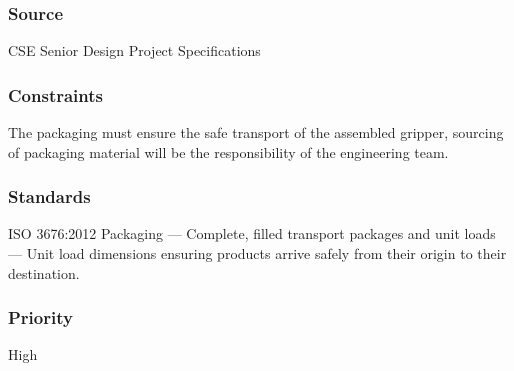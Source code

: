 \subsubsection{Source}
CSE Senior Design Project Specifications
\subsubsection{Constraints}
The packaging must ensure the safe transport of the assembled gripper, sourcing of packaging material will be the responsibility of the engineering team.
\subsubsection{Standards}
ISO 3676:2012 Packaging — Complete, filled transport packages and unit loads — Unit load dimensions ensuring products arrive safely from their origin to their destination.
\subsubsection{Priority}
High